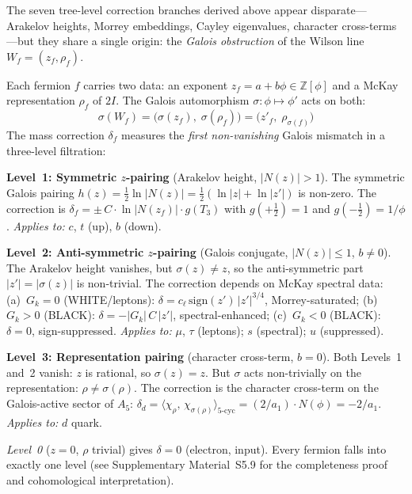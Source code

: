 \documentclass[12pt,a4paper]{article}
\theoremstyle{definition}
\begin{document}
The seven tree-level correction branches derived above appear disparate---Arakelov heights, Morrey embeddings, Cayley eigenvalues, character cross-terms---but they share a single origin: the \emph{Galois obstruction} of the Wilson line $W_f = (z_f, \rho_f)$.

Each fermion $f$ carries two data: an exponent $z_f = a + b\phi \in \mathbb{Z}[\phi]$ and a McKay representation $\rho_f$ of $2I$.  The Galois automorphism $\sigma: \phi \mapsto \phi'$ acts on both:
\begin{equation}
\sigma(W_f) = \bigl(\sigma(z_f),\; \sigma(\rho_f)\bigr) = \bigl(z'_f,\; \rho_{\sigma(f)}\bigr)
\end{equation}
The mass correction $\delta_f$ measures the \emph{first non-vanishing} Galois mismatch in a three-level filtration:

\noindent\textbf{Level~1: Symmetric $z$-pairing} (Arakelov height, $|N(z)| > 1$).
  The symmetric Galois pairing $h(z) = \tfrac{1}{2}\ln|N(z)| = \tfrac{1}{2}(\ln|z| + \ln|z'|)$ is non-zero.  The correction is
  $\delta_f = \pm\,C \cdot \ln|N(z_f)| \cdot g(T_3)$
  with $g(+\tfrac{1}{2}) = 1$ and $g(-\tfrac{1}{2}) = 1/\phi$.
  \emph{Applies to:} $c$, $t$ (up), $b$ (down).

\smallskip\noindent\textbf{Level~2: Anti-symmetric $z$-pairing} (Galois conjugate, $|N(z)| \leq 1$, $b \neq 0$).
  The Arakelov height vanishes, but $\sigma(z) \neq z$, so the anti-symmetric part $|z'| = |\sigma(z)|$ is non-trivial.  The correction depends on McKay spectral data:
  (a)~$G_k = 0$ (WHITE/leptons): $\delta = c_\ell\,\mathrm{sign}(z')\,|z'|^{3/4}$, Morrey-saturated;
  (b)~$G_k > 0$ (BLACK): $\delta = -|G_k|\,C\,|z'|$, spectral-enhanced;
  (c)~$G_k < 0$ (BLACK): $\delta = 0$, sign-suppressed.
  \emph{Applies to:} $\mu$, $\tau$ (leptons); $s$ (spectral); $u$ (suppressed).

\smallskip\noindent\textbf{Level~3: Representation pairing} (character cross-term, $b = 0$).
  Both Levels~1 and~2 vanish: $z$ is rational, so $\sigma(z) = z$.  But $\sigma$ acts non-trivially on the representation: $\rho \neq \sigma(\rho)$.  The correction is the character cross-term on the Galois-active sector of $A_5$:
  $\delta_d = \langle\chi_\rho,\,\chi_{\sigma(\rho)}\rangle_{\text{5-cyc}} = (2/a_1)\cdot N(\phi) = -2/a_1$.
  \emph{Applies to:} $d$ quark.

\smallskip

\noindent\emph{Level~0} ($z = 0$, $\rho$ trivial) gives $\delta = 0$ (electron, input).  Every fermion falls into exactly one level (see Supplementary Material~S5.9 for the completeness proof and cohomological interpretation).
\end{document}
